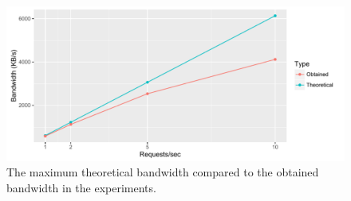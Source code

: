 \begin{figure}[!h]
	\centering
	\includegraphics[width=0.8\columnwidth]{images/experiments/api_bandwidth_performance}
	\caption{The maximum theoretical bandwidth compared to the obtained bandwidth in the experiments.}
	\label{fig:api-bandwidth-performance}
\end{figure}

